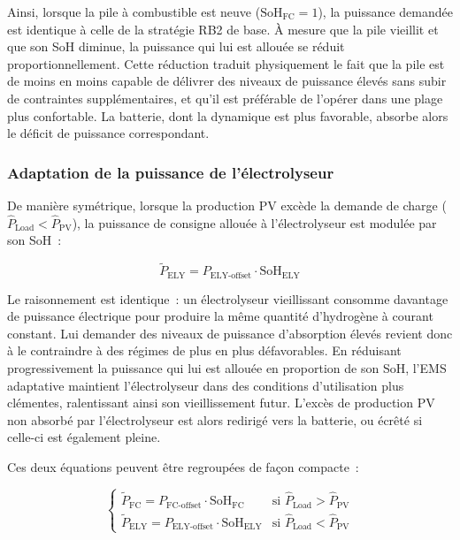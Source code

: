 Ainsi, lorsque la pile à combustible est neuve ($\text{SoH}_{\text{FC}} = 1$), la puissance demandée est identique à celle de la stratégie RB2 de base. À mesure que la pile vieillit et que son SoH diminue, la puissance qui lui est allouée se réduit proportionnellement. Cette réduction traduit physiquement le fait que la pile est de moins en moins capable de délivrer des niveaux de puissance élevés sans subir de contraintes supplémentaires, et qu'il est préférable de l'opérer dans une plage plus confortable. La batterie, dont la dynamique est plus favorable, absorbe alors le déficit de puissance correspondant.

\subsubsection{Adaptation de la puissance de l'électrolyseur}

De manière symétrique, lorsque la production PV excède la demande de charge ($\hat{P}_{\text{Load}} < \hat{P}_{\text{PV}}$), la puissance de consigne allouée à l'électrolyseur est modulée par son SoH~:

\begin{equation}
    \tilde{P}_{\text{ELY}} = P_{\text{ELY-offset}} \cdot \text{SoH}_{\text{ELY}}
    \label{eq:adaptation_ely}
\end{equation}

Le raisonnement est identique~: un électrolyseur vieillissant consomme davantage de puissance électrique pour produire la même quantité d'hydrogène à courant constant. Lui demander des niveaux de puissance d'absorption élevés revient donc à le contraindre à des régimes de plus en plus défavorables. En réduisant progressivement la puissance qui lui est allouée en proportion de son SoH, l'EMS adaptative maintient l'électrolyseur dans des conditions d'utilisation plus clémentes, ralentissant ainsi son vieillissement futur. L'excès de production PV non absorbé par l'électrolyseur est alors redirigé vers la batterie, ou écrêté si celle-ci est également pleine.

Ces deux équations peuvent être regroupées de façon compacte~:

\begin{equation}
\label{eq:fc-ely-compact}
\begin{cases}
\tilde{P}_{\text{FC}}  = P_{\text{FC-offset}}  \cdot \text{SoH}_{\text{FC}}  & \text{si } \hat{P}_{\text{Load}} > \hat{P}_{\text{PV}} \\
\tilde{P}_{\text{ELY}} = P_{\text{ELY-offset}} \cdot \text{SoH}_{\text{ELY}} & \text{si } \hat{P}_{\text{Load}} < \hat{P}_{\text{PV}}
\end{cases}
\end{equation}


